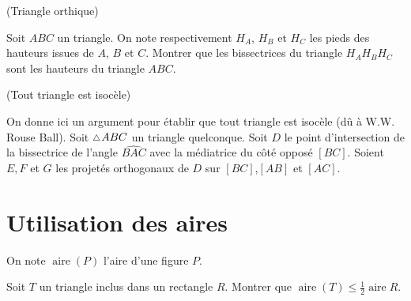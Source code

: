 \documentclass[a4paper,11pt,reqno]{amsart}
\DeclareMathOperator{\aire}{aire}
\begin{document}
\begin{exo} (Triangle orthique)

  Soit $ABC$ un triangle. On note respectivement $H_A$, $H_B$ et $H_C$ les pieds des hauteurs issues de $A$, $B$ et $C$. Montrer que les bissectrices du triangle $H_AH_BH_C$ sont les hauteurs du triangle $ABC$.
\end{exo}

\begin{exo} (Tout triangle est isocèle)

  On donne ici un argument pour établir que tout triangle est isocèle (dû à W.W. Rouse Ball).
  Soit $\tri ABC$ un triangle quelconque. Soit $D$ le point d'intersection de la bissectrice de l'angle $\widehat{BAC}$ avec la médiatrice du côté opposé $[BC]$. Soient $E,F$ et $G$ les projetés orthogonaux de $D$ sur $[BC]$,$[AB]$ et $[AC]$.\baselineskip
\end{exo}


\section{Utilisation des aires}

\begin{convention}
  On note $\aire (P)$ l'aire d'une figure $P$.
\end{convention}

\begin{exo}

  Soit $T$ un triangle inclus dans un rectangle $R$. Montrer que $\aire(T) \leqslant \frac{1}{2}\aire{R}$.
\end{exo}
\end{document}
